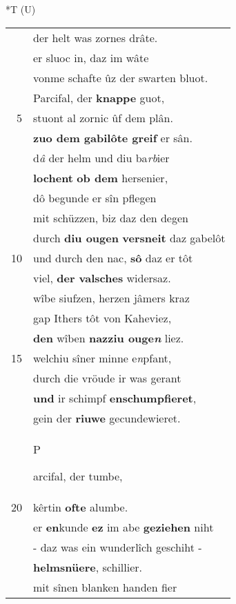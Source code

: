 \documentclass[8pt,a4paper,notitlepage]{article}
\begin{document}
\begin{table}[ht]
\begin{minipage}[t]{0.5\linewidth}
\end{minipage}
\hspace{0.5cm}
\begin{minipage}[t]{0.5\linewidth}
\small
\begin{center}*T (U)
\end{center}
\begin{tabular}{rl}
 & der helt was zornes drâte.\\ 
 & er sluoc in, daz im wâte\\ 
 & vonme schafte ûz der swarten bluot.\\ 
 & Parcifal, der \textbf{knappe} guot,\\ 
5 & stuont al zornic ûf dem plân.\\ 
 & \textbf{zuo dem gabilôte greif} er sân.\\ 
 & d\textit{â} der helm und diu ba\textit{rb}ier\\ 
 & \textbf{lochent} \textbf{ob dem} hersenier,\\ 
 & dô begunde er sîn pflegen\\ 
 & mit schüzzen, biz daz den degen\\ 
 & durch \textbf{diu ougen} \textbf{versneit} daz gabelôt\\ 
10 & und durch den nac, \textbf{sô} daz er tôt\\ 
 & viel, \textbf{der valsches} widersaz.\\ 
 & wîbe siufzen, herzen jâmers kraz\\ 
 & gap Ithers tôt von Kaheviez,\\ 
 & \textbf{den} wîben \textbf{nazziu ouge\textit{n}} liez.\\ 
15 & welchiu sîner minne e\textit{n}pfant,\\ 
 & durch die vröude ir was gerant\\ 
 & \textbf{und} ir schimpf \textbf{enschumpfieret},\\ 
 & gein der \textbf{riuwe} gecundewieret.\\ 
 & \begin{large}P\end{large}arcifal, der tumbe,\\ 
20 & kêrtin \textbf{ofte} alumbe.\\ 
 & er \textbf{en}kunde \textbf{ez} im abe \textbf{geziehen} niht\\ 
 & - daz was ein wunderlîch geschiht -\\ 
 & \textbf{helmsnüere}, schillier.\\ 
 & mit sînen blanken handen fier\\ 

\end{tabular}
\end{minipage}
\end{table}
\end{document}
